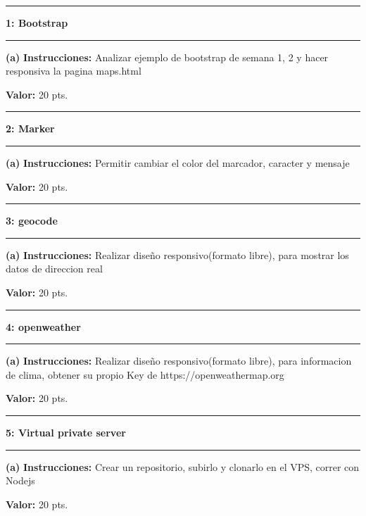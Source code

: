\documentclass[11pt]{article}
\newcommand\question[2]{\vspace{.25in}\hrule\textbf{#1: #2}\vspace{.5em}\hrule\vspace{.10in}}
\renewcommand\part[1]{\vspace{.10in}\textbf{(#1)}}
\newcommand\algorithm{\vspace{.10in}\textbf{Instrucciones: }}
\newcommand\correctness{\vspace{.10in}\textbf{Valor: }}
\begin{document}
\raggedright

\newcommand\NAME{Adolfo Centeno}  
\newcommand\ADSOFTID{adsoft}     
\newcommand\HWNUM{1}              

\question{1}{Bootstrap} 

\part{a} \algorithm Analizar ejemplo de bootstrap de semana 1, 2 y hacer responsiva la pagina maps.html

\correctness 20 pts.

\question{2}{Marker}
\part{a} \algorithm Permitir cambiar el color del marcador, caracter y mensaje

\correctness 20 pts.

\question{3}{geocode}
\part{a} \algorithm Realizar diseño responsivo(formato libre), para mostrar los datos de direccion real

\correctness 20 pts.


\question{4}{openweather}
\part{a} \algorithm Realizar diseño responsivo(formato libre), para informacion de clima, obtener su propio Key de https://openweathermap.org

\correctness 20 pts.


\question{5}{Virtual private server}
\part{a} \algorithm Crear un repositorio, subirlo y clonarlo en el VPS, correr con Nodejs

\correctness 20 pts.
\end{document}
